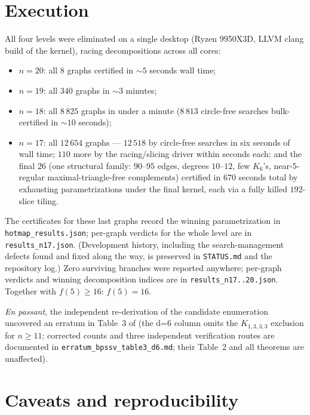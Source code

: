 \documentclass[11pt]{article}
\begin{document}
\section*{Execution}

All four levels were eliminated on a single desktop (Ryzen 9950X3D, LLVM
clang build of the kernel), racing decompositions across all cores:
\begin{itemize}
\item $n=20$: all $8$ graphs certified in ${\sim}5$ seconds wall time;
\item $n=19$: all $340$ graphs in ${\sim}3$ minutes;
\item $n=18$: all $8\,825$ graphs in under a minute ($8\,813$ circle-free
      searches bulk-certified in ${\sim}10$ seconds);
\item $n=17$: all $12\,654$ graphs --- $12\,518$ by circle-free searches
      in six seconds of wall time; $110$ more by the racing/slicing
      driver within seconds each; and the final $26$ (one structural
      family: $90$--$95$ edges, degrees $10$--$12$, few $K_6$'s,
      near-$5$-regular maximal-triangle-free complements) certified in
      $670$ seconds total by exhausting parametrizations under the
      final kernel, each via a fully killed $192$-slice tiling.
\end{itemize}
The certificates for these last graphs record the winning
parametrization in \texttt{hotmap\_results.json}; per-graph verdicts
for the whole level are in \texttt{results\_n17.json}. (Development
history, including the search-management defects found and fixed along
the way, is preserved in \texttt{STATUS.md} and the repository log.)
Zero surviving branches were reported anywhere; per-graph verdicts and
winning decomposition indices are in \texttt{results\_n17..20.json}.
Together with $f(5)\ge16$: $f(5)=16$.

\emph{En passant}, the independent re-derivation of the candidate
enumeration uncovered an erratum in Table~3 of \cite{BPSSV} (the d=6
column omits the $K_{1,3,3,3}$ exclusion for $n\ge11$; corrected counts
and three independent verification routes are documented in
\texttt{erratum\_bpssv\_table3\_d6.md}; their Table~2 and all theorems
are unaffected).

\section*{Caveats and reproducibility}
\end{document}
